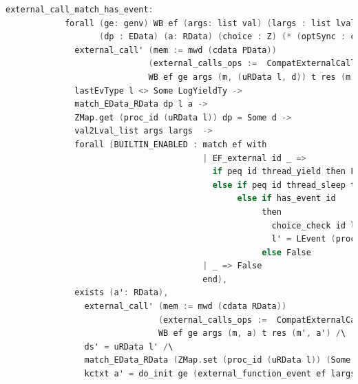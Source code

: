 \begin{lstlisting}[language=C]     
          external_call_match_has_event:
            forall (ge: genv) WB ef (args: list val) (largs : list lval) t res (m m' : mem) l l' d d' ds' 
                   (dp : EData) (a: RData) (choice : Z) (* (optSync : option SyncChanPool) *),
              external_call' (mem := mwd (cdata PData)) 
                             (external_calls_ops :=  CompatExternalCalls.compatlayer_extcall_ops (LH  <@$\oplus$@>  L64))
                             WB ef ge args (m, (uRData l, d)) t res (m', (ds', d')) ->
              lastEvType l <> Some LogYieldTy ->
              match_EData_RData dp l a ->
              ZMap.get (proc_id (uRData l)) dp = Some d ->
              val2Lval_list args largs  ->
              forall (BUILTIN_ENABLED : match ef with
                                        | EF_external id _ => 
                                          if peq id thread_yield then False
                                          else if peq id thread_sleep then False
                                               else if has_event id 
                                                    then
                                                      choice_check id largs (uRData l) d = choice /\
                                                      l' = LEvent (proc_id (uRData l)) (LogPrim id largs choice (snap_func d)) :: l 
                                                    else False 
                                        | _ => False
                                        end),
              exists (a': RData),
                external_call' (mem := mwd (cdata RData)) 
                               (external_calls_ops :=  CompatExternalCalls.compatlayer_extcall_ops (pbthread  <@$\oplus$@>  L64))
                               WB ef ge args (m, a) t res (m', a') /\
                ds' = uRData l' /\
                match_EData_RData (ZMap.set (proc_id (uRData l)) (Some d') dp) l' a' /\
                kctxt a' = do_init ge (external_function_event ef largs l choice (snap_func d)) l (kctxt a);
\end{lstlisting}
         
